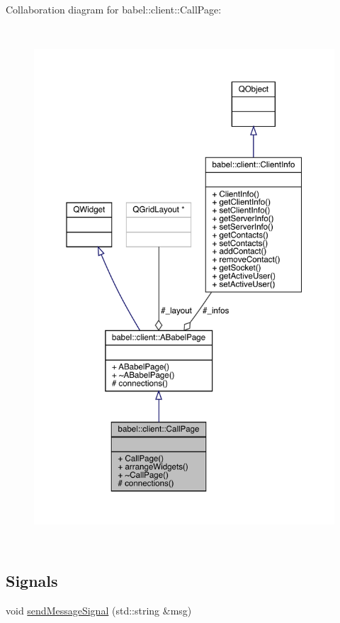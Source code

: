Collaboration diagram for babel\+:\+:client\+:\+:Call\+Page\+:\nopagebreak
\begin{figure}[H]
\begin{center}
\leavevmode
\includegraphics[height=550pt]{classbabel_1_1client_1_1_call_page__coll__graph}
\end{center}
\end{figure}
\subsection*{Signals}
\begin{DoxyCompactItemize}
\item 
void \mbox{\hyperlink{classbabel_1_1client_1_1_call_page_a4019f93ce9b26918fe4dfe91399d2b38}{send\+Message\+Signal}} (std\+::string \&msg)
\end{DoxyCompactItemize}
